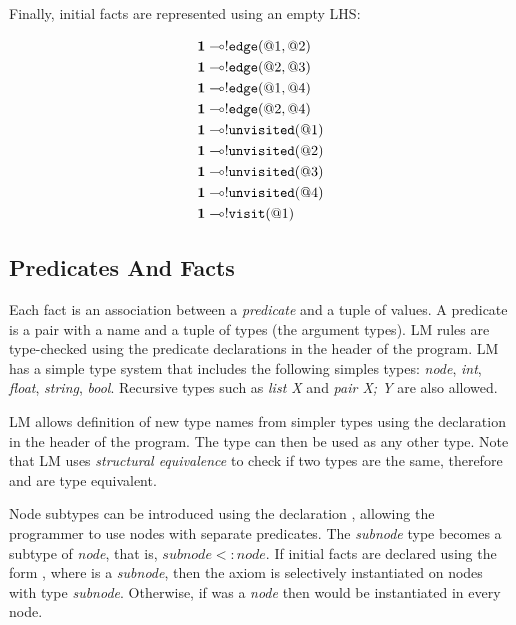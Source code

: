 Finally, initial facts are represented using an empty LHS:

\nopagebreak

\begin{align}
\mathbf{1} \multimap & {!} \mathtt{edge}(@1, @2) \\
\mathbf{1} \multimap & {!} \mathtt{edge}(@2, @3) \\
\mathbf{1} \multimap & {!} \mathtt{edge}(@1, @4) \\
\mathbf{1} \multimap & {!} \mathtt{edge}(@2, @4) \\
\mathbf{1} \multimap & {!} \mathtt{unvisited}(@1)  \\
\mathbf{1} \multimap & {!} \mathtt{unvisited}(@2) \\
\mathbf{1} \multimap & {!} \mathtt{unvisited}(@3) \\
\mathbf{1} \multimap & {!} \mathtt{unvisited}(@4) \\
\mathbf{1} \multimap & {!} \mathtt{visit}(@1)
\end{align}

\subsection{Predicates And Facts}

Each fact is an association between a \emph{predicate} and a tuple of values. A
predicate is a pair with a name and a tuple of types (the argument types). LM
rules are type-checked using the predicate declarations in the header of the
program. LM has a simple type system that includes the following simples types:
\emph{node}, \emph{int}, \emph{float}, \emph{string}, \emph{bool}. Recursive
types such as \emph{list X} and \emph{pair X; Y} are also allowed.

LM allows definition of new type names from simpler types using the declaration
 in the header of the program. The type
 can then be used as any other type. Note that LM uses
\emph{structural equivalence} to check if two types are the same, therefore
 and  are type equivalent.

Node subtypes can be introduced using the declaration ,
allowing the programmer to use nodes with separate predicates.  The
\emph{subnode} type becomes a subtype of \emph{node}, that is, $subnode <:
node$. If initial facts are declared using the form , where  is a
\emph{subnode}, then the axiom is selectively instantiated on nodes with type
\emph{subnode}. Otherwise, if  was a \emph{node} then  would
be instantiated in every node.

